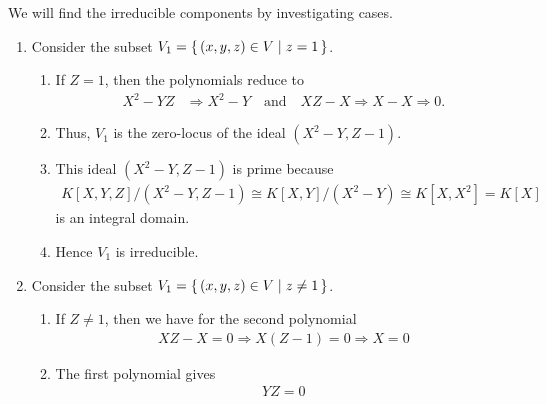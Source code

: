\begin{solution}
    We will find the irreducible components by investigating cases.
    \begin{enumerate}
        \item Consider the subset \(V_1 = \left\{\, (x, y, z) \in V \mathrel{\mid} z = 1 \,\right\}\).
        \begin{enumerate}
            \item If \(Z = 1\), then the polynomials reduce to
            \begin{align*}
                X^2 - YZ &\Rightarrow X^2 - Y \quad \text{and} \quad XZ - X \Rightarrow X - X \Rightarrow 0 \text{.}
            \end{align*}
            \item Thus, \(V_1\) is the zero-locus of the ideal \((X^2 - Y, Z - 1)\).
            \item This ideal \((X^2 - Y, Z - 1)\) is prime because
            \begin{align*}
                K[X, Y, Z] / (X^2 - Y, Z - 1) \cong K[X, Y]/(X^2- Y) \cong K[X, X^2] = K[X]
            \end{align*}
            is an integral domain.
            \item Hence \(V_1\) is irreducible.
        \end{enumerate}
        \item Consider the subset \(V_1 = \left\{\, (x, y, z) \in V \mathrel{\mid} z \neq 1 \,\right\}\).
        \begin{enumerate}
            \item If \(Z \neq 1\), then we have for the second polynomial
            \begin{align*}
                XZ - X = 0 \Rightarrow X (Z - 1) = 0 \Rightarrow X = 0
            \end{align*}
            \item The first polynomial gives
            \begin{align*}
                YZ = 0
            \end{align*}
        \end{enumerate}
    \end{enumerate}
\end{solution}

    

